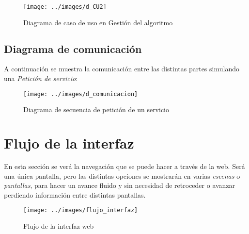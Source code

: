 \bigskip
\begin{figure}[h]
	\centering
	\texttt{[image: ../images/d\_CU2]}
	\caption[Diagrama de caso de uso en Gestión del algoritmo]{Diagrama de caso de uso en Gestión del algoritmo}
	\label{fig:d_CU2}
\end{figure}


\newpage
\subsection{Diagrama de comunicación}
\bigskip
A continuación se muestra la comunicación entre las distintas partes simulando una \textit{Petición de servicio}:


\bigskip
\begin{figure}[h]
	\centering
	\texttt{[image: ../images/d\_comunicacion]}
	\caption[Diagrama de secuencia de petición de un servicio]{Diagrama de secuencia de petición de un servicio}
	\label{fig:d_comunicacion}
\end{figure}



\newpage %
\section{Flujo de la interfaz}
\bigskip

En esta sección se verá la navegación que se puede hacer a través de la web. Será una única pantalla, pero las distintas opciones se mostrarán en varias \textit{escenas} o \textit{pantallas}, para hacer un avance fluido y sin necesidad de retroceder o avanzar perdiendo información entre distintas pantallas.

\bigskip
\begin{figure}[h]
	\centering
	\texttt{[image: ../images/flujo\_interfaz]}
	\caption[Flujo de la interfaz web]{Flujo de la interfaz web}
	\label{fig:flujo_interfaz}
\end{figure}

